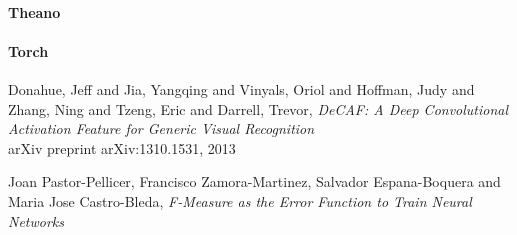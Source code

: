 \documentclass[a4paper,11pt]{article}
\begin{document}
\paragraph{Theano}

\paragraph{Torch}

\clearpage



\clearpage
\begin{thebibliography}{1}
 Donahue, Jeff and Jia, Yangqing and Vinyals, Oriol and Hoffman, Judy and Zhang, Ning and Tzeng, Eric and Darrell, Trevor,
  \emph{DeCAF: A Deep Convolutional Activation Feature for Generic Visual Recognition}\\
  arXiv preprint arXiv:1310.1531, 2013

 Joan Pastor-Pellicer, Francisco Zamora-Martinez, Salvador Espana-Boquera and Maria Jose Castro-Bleda,
  \emph{F-Measure as the Error Function to Train Neural Networks}\\

\end{thebibliography}
\end{document}
